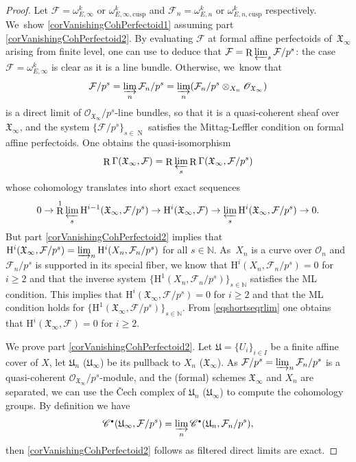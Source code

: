 \documentclass[JEP,XML,SOM,Unicode,published]{cedram}
\newcommand{\sbullet}{{\scriptscriptstyle\bullet}}
\newcommand{\cusp}{\mathrm{cusp}}
\numberwithin{equation}{section}
\theoremstyle{definition}
\newcommand{\bb}[1]{\mathbb{#1}}
\newcommand{\n}[1]{\mathcal{#1}}
\newcommand{\f}[1]{\mathfrak{#1}}
\newcommand{\s}[1]{\mathscr{#1}}
\DeclareMathOperator{\R}{R}
\DeclareMathOperator{\N}{N}
\begin{document}
\begin{proof}
Let $\n{F}= \omega^k_{E,\infty}$ or $\omega^{k}_{E,\infty,\cusp}$ and $\n{F}_n=\omega^k_{E,n}$ or $\omega^k_{E,n,\cusp}$ respectively. We~show \eqref{corVanishingCohPerfectoid1} assuming part \eqref{corVanishingCohPerfectoid2}. By evaluating $\n{F}$ at formal affine perfectoids of~$\f{X}_{\infty}$ arising from finite level, one can use \cite[Lem.\,3.18]{MR3090230} to deduce that $\n{F}= \R\varprojlim_s \n{F}/p^s$: the case $\n{F}= \omega_{E,\infty}^k$ is clear as it is a line bundle. Otherwise, we~know that
\[
\n{F}/p^s=\varinjlim_n \n{F}_n/p^s=\varinjlim_n (\n{F}_n/p^s\otimes_{X_n}\s{O}_{\f{X}_{\infty}})
\]
is a direct limit of $\s{O}_{\f{X}_{\infty}}/p^s$-line bundles, so that it is a quasi-coherent sheaf over~$\f{X}_{\infty}$, and the system $\{\n{F}/p^s\}_{s\in \N}$ satisfies the Mittag-Leffler condition on formal affine perfectoids. One obtains the quasi-isomorphism
\[
\R\Gamma(\f{X}_{\infty}, \n{F})= \R\varprojlim_s \R\Gamma(\f{X}_{\infty}, \n{F}/p^s)
\]
whose cohomology translates into short exact sequences
\begin{equation}
\label{eqshortseqrlim}
0\to \R^1\varprojlim_s \mathrm{H}^{i-1}(\f{X}_{\infty}, \n{F}/p^s) \to \mathrm{H}^{i}(\f{X}_{\infty}, \n{F}) \to \varprojlim_{s} \mathrm{H}^{i}(\f{X}_{\infty}, \n{F}/p^s) \to 0.
\end{equation}
But part \eqref{corVanishingCohPerfectoid2} implies that $\mathrm{H}^i(\f{X}_{\infty}, \n{F}/p^s)= \varinjlim_{n} \mathrm{H}^i(X_n, \n{F}_n/p^s)$ for all $s\in \bb{N}$. As~$X_n$ is a curve over $\n{O}_n$ and $\n{F}_n/p^s$ is supported in its special fiber, we know that $ \mathrm{H}^i(X_n, \n{F}_n/p^s)=0$ for $i\geq 2$ and that the inverse system $\{\mathrm{H}^1(X_n, \n{F}_n/p^s)\}_{s\in \bb{N}}$ satisfies the ML condition. This implies that $\mathrm{H}^i(\f{X}_{\infty}, \n{F}/p^s)=0$ for $i\geq 2$ and that the ML condition holds for $\{\mathrm{H}^1(\f{X}_{\infty}, \n{F}/p^s)\}_{s\in \bb{N}}$. From \eqref{eqshortseqrlim} one obtains that $\mathrm{H}^i(\f{X}_{\infty}, \n{F})=0$ for $i\geq 2$.

We prove part \eqref{corVanishingCohPerfectoid2}. Let $\f{U}=\{U_i\}_{i\in I}$ be a finite affine cover of $X$, let $\f{U}_n$ (\resp $\f{U}_{\infty}$) be its pullback to $X_n$ (\resp $\f{X}_{\infty}$). As $\n{F}/p^s=\varinjlim_n \n{F}_n/p^s$ is a quasi-coherent $\s{O}_{\f{X}_{\infty}}/p^s$-module, and the (formal) schemes $\f{X}_{\infty}$ and $X_n$ are separated, we can use the \v{C}ech complex of $\f{U}_n$ (\resp $\f{U}_{\infty}$) to compute the cohomology groups. By definition we have
\[
\s{C}^{\sbullet}(\f{U}_{\infty}, \n{F}/p^s) = \varinjlim_n \s{C}^{\sbullet}(\f{U}_n, \n{F}_n/p^s),
\]
then \eqref{corVanishingCohPerfectoid2} follows as filtered direct limits are exact.


\end{proof}
\end{document}
